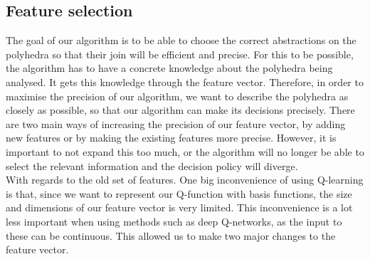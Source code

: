 \subsection{Feature selection}
The goal of our algorithm is to be able to choose the correct abstractions on the polyhedra so that their join will be efficient and precise. For this to be possible, the algorithm has to have a concrete knowledge about the polyhedra being analysed. It gets this knowledge through the feature vector. Therefore, in order to maximise the precision of our algorithm, we want to describe the polyhedra as closely as possible, so that our algorithm can make its decisions precisely. There are two main ways of increasing the precision of our feature vector, by adding new features or by making the existing features more precise. However, it is important to not expand this too much, or the algorithm will no longer be able to select the relevant information and the decision policy will diverge.\\
With regards to the old set of features. One big inconvenience of using Q-learning is that, since we want to represent our Q-function with basis functions, the size and dimensions of our feature vector is very limited. This inconvenience is a lot less important when using methods such as deep Q-networks, as the input to these can be continuous. This allowed us to make two major changes to the feature vector. 
